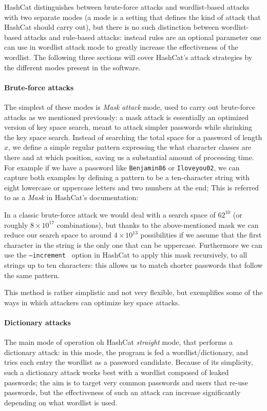 HashCat distinguishes between brute-force attacks and wordlist-based attacks with two separate modes (a mode is a setting that defines the kind of attack that HashCat should carry out), but there is no such distinction between wordlist-based attacks and rule-based attacks: instead rules are an optional parameter one can use in wordlist attack mode to greatly increase the effectiveness of the wordlist. The following three sections will cover HashCat's attack strategies by the different modes present in the software. 

\paragraph{Brute-force attacks}\label{par:brute-force}
The simplest of these modes is \emph{Mask attack} mode, used to carry out brute-force attacks as we mentioned previously: a mask attack is essentially an optimized version of key space search, meant to attack simpler passwords while shrinking the key space search. 
Instead of searching the total space for a password of length $x$, we define a simple regular pattern expressing the what character classes are there and at which position, saving us a substantial amount of processing time.
For example if we have a password like \texttt{Benjamin86} or \texttt{Iloveyou02}, we can capture both examples by defining a pattern to be a ten-character string with eight lowercase or uppercase letters and two numbers at the end; This is referred to as a \emph{Mask} in HashCat's documentation:

In a classic brute-force attack we would deal with a search space of $62^{10}$ (or roughly $8 \times 10^{17}$ combinations), but thanks to the above-mentioned mask we can reduce our search space to around $4 \times 10^{13}$ possibilities if we assume that the first character in the string is the only one that can be uppercase.
Furthermore we can use the \texttt{--increment } option in HashCat to apply this mask recursively, to all strings up to ten characters: this allows us to match shorter passwords that follow the same pattern.

This method is rather simplistic and not very flexible, but exemplifies some of the ways in which attackers can optimize key space attacks.

\paragraph{Dictionary attacks}
The main mode of operation oh HashCat \emph{straight} mode, that performs a dictionary attack: in this mode, the program is fed a wordlist/dictionary, and tries each entry the wordlist as a password candidate. Because of its simplicity, such a dictionary attack works best with a wordlist composed of leaked passwords; the aim is to target very common passwords and users that re-use passwords, but the effectiveness of such an attack can increase significantly depending on what wordlist is used.

